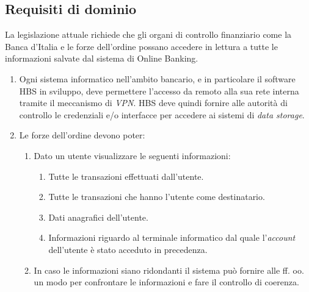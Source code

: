 \subsection{Requisiti di dominio}

La legislazione attuale richiede che gli organi di controllo finanziario come la Banca d'Italia e le forze dell'ordine possano accedere in lettura a tutte le informazioni salvate dal sistema di Online Banking.

\begin{enumerate}
\item Ogni sistema informatico nell'ambito bancario, e in particolare il software HBS in sviluppo, deve permettere l'accesso da remoto alla sua rete interna tramite il meccanismo di \emph{VPN}.
	HBS deve quindi fornire alle autorit\`a di controllo le credenziali e/o interfacce per accedere ai sistemi di \emph{data storage}.

	\item Le forze dell'ordine devono poter:
	\begin{enumerate}
    	\item Dato un utente visualizzare le seguenti informazioni:
        	\begin{enumerate}
            	\item Tutte le transazioni effettuati dall'utente.
            	\item Tutte le transazioni che hanno l'utente come destinatario.
	            \item Dati anagrafici dell'utente.
    	        \item Informazioni riguardo al terminale informatico dal quale l'\emph{account} dell'utente \`e stato acceduto in precedenza.
	        \end{enumerate}
	    \item In caso le informazioni siano ridondanti il sistema pu\`o fornire alle ff. oo. un modo per confrontare le informazioni e fare il controllo di coerenza.
	\end{enumerate}


\end{enumerate}
